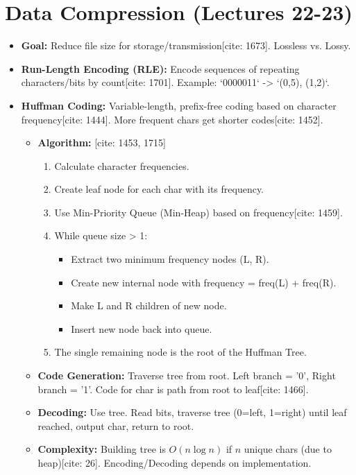 \documentclass{article}
\begin{document}
\section{Data Compression (Lectures 22-23)}
\begin{itemize}
    \item \textbf{Goal:} Reduce file size for storage/transmission[cite: 1673]. Lossless vs. Lossy.
    \item \textbf{Run-Length Encoding (RLE):} Encode sequences of repeating characters/bits by count[cite: 1701]. Example: `0000011` -> `(0,5), (1,2)`.
    \item \textbf{Huffman Coding:} Variable-length, prefix-free coding based on character frequency[cite: 1444]. More frequent chars get shorter codes[cite: 1452].
          \begin{itemize}
              \item \textbf{Algorithm:} [cite: 1453, 1715]
                    \begin{enumerate}
                        \item Calculate character frequencies.
                        \item Create leaf node for each char with its frequency.
                        \item Use Min-Priority Queue (Min-Heap) based on frequency[cite: 1459].
                        \item While queue size > 1:
                              \begin{itemize}
                                  \item Extract two minimum frequency nodes (L, R).
                                  \item Create new internal node with frequency = freq(L) + freq(R).
                                  \item Make L and R children of new node.
                                  \item Insert new node back into queue.
                              \end{itemize}
                        \item The single remaining node is the root of the Huffman Tree.
                    \end{enumerate}
              \item \textbf{Code Generation:} Traverse tree from root. Left branch = '0', Right branch = '1'. Code for char is path from root to leaf[cite: 1466].
              \item \textbf{Decoding:} Use tree. Read bits, traverse tree (0=left, 1=right) until leaf reached, output char, return to root.
              \item \textbf{Complexity:} Building tree is $O(n \log n)$ if $n$ unique chars (due to heap)[cite: 26]. Encoding/Decoding depends on implementation.
          \end{itemize}
\end{itemize}
\end{document}
